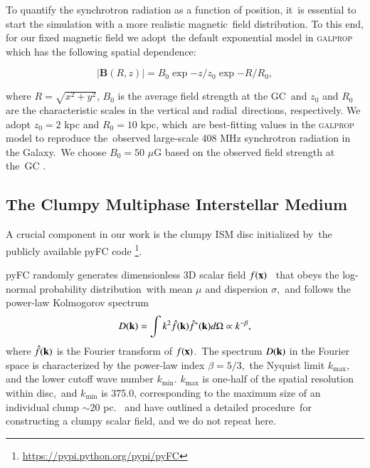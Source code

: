 \documentclass[twocolumn]{aastex631}
\begin{document}
  To quantify the synchrotron radiation as a function of position, it\
  is essential to start the simulation with a more realistic magnetic\
  field distribution. To this end, for our fixed magnetic field we adopt\
  the default exponential model in \textsc{galprop} \citep{Strong2007}
  which has the following spatial dependence:\

  \begin{equation}
     |\mathbf{B}(R, z)|=B_{0}\exp{-z/z_{0}}\exp{-R/R_{0}},
     \label{magnetic-field}
  \end{equation}


  where $R=\sqrt{x^{2}+y^{2}}$, $B_{0}$ is the average field strength at the GC\
  and $z_{0}$ and $R_{0}$ are the characteristic scales in the vertical and radial\
  directions, respectively. We adopt $z_{0} = 2$ kpc and $R_{0} = 10$ kpc, which\
  are best-fitting values in the \textsc{galprop} model to reproduce the\
  observed large-scale 408 MHz synchrotron radiation in the Galaxy.\
  We choose $B_{0} = 50$ $\mu$G based on the observed field strength at the\
  GC \citep{Crocker2010}.



  \subsection{The Clumpy Multiphase Interstellar Medium}

  A crucial component in our work is the clumpy ISM disc initialized by\
  the publicly available pyFC code
  \footnote{\url{https://pypi.python.org/pypi/pyFC}}.\

  pyFC randomly generates dimensionless 3D scalar field $f(\bold{x})$\ %
  that obeys the log-normal probability distribution\
  with mean $\mu$ and dispersion $\sigma$,\
  and follows the power-law Kolmogorov spectrum
  \begin{equation}
    D(\bold{k})=\int k^{2} \hat{f}(\bold{k})\hat{f}^{*}(\bold{k})d\Omega \propto k^{-\beta},
    \label{Kolmogorov-spectrum}
  \end{equation}
  where $\hat{f}(\bold{k})$ is the Fourier transform of $f(\bold{x})$.\
  The spectrum $D(\bold{k})$ in the Fourier space is characterized by the power-law index $\beta=5/3$,\
  the Nyquist limit $k_{\text{max}}$, and the lower cutoff wave number $k_{\text{min}}$.
  $k_{\text{max}}$ is one-half of the spatial resolution within disc,\
  and $k_{\text{min}}$ is 375.0, corresponding to the maximum size of an individual clump $\sim 20$ pc.\
  \citet{LA2002} and \citet{Wagner2012} have outlined a detailed procedure\
  for constructing a clumpy scalar field, and we do not repeat here.
\end{document}

